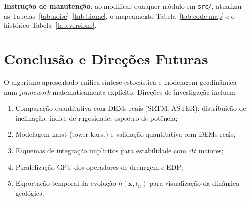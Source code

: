 \documentclass[11pt,a4paper]{article}
\begin{document}
\textbf{Instrução de manutenção}: ao modificar qualquer módulo em \texttt{src/},
atualizar as Tabelas~\ref{tab:noise}--\ref{tab:biome}, o mapeamento
Tabela~\ref{tab:code-map} e o histórico Tabela~\ref{tab:versions}.

\section{Conclusão e Direções Futuras}

O algoritmo apresentado unifica síntese estocástica e modelagem geodinâmica num
\emph{framework} matematicamente explícito. Direções de investigação incluem:

\begin{enumerate}
  \item Comparação quantitativa com DEMs reais (SRTM, ASTER): distribuição de
        inclinação, índice de rugosidade, espectro de potência;
  \item Modelagem karst (tower karst) e validação quantitativa com DEMs reais;
  \item Esquemas de integração implícitos para estabilidade com $\Delta t$ maiores;
  \item Paralelização GPU dos operadores de drenagem e EDP;
  \item Exportação temporal da evolução $h(\mathbf{x}, t_n)$ para visualização
        da dinâmica geológica.
\end{enumerate}
\end{document}
